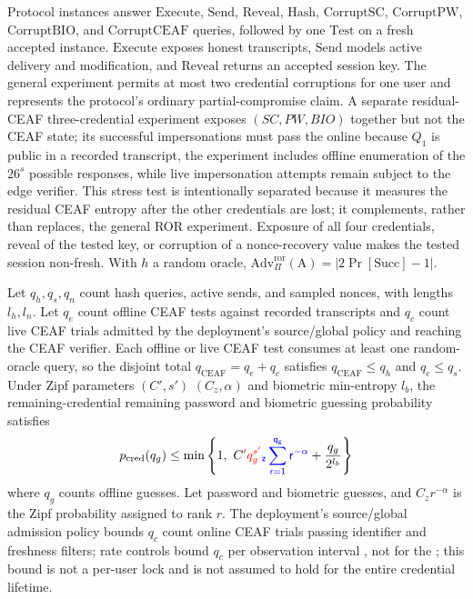 \documentclass[cmc,article,submit,moreauthors,pdftex]{Definitions/tsp}
\renewcommand{\mathsf}[1]{\mathrm{#1}}
\renewcommand{\mathcal}[1]{\mathrm{#1}}
\newcommand{\advA}{\mathcal{A}}
\providecommand{\DIFadd}[1]{{\protect\color{blue} \sf #1}} %
\providecommand{\DIFdel}[1]{{\protect\color{red} \scriptsize #1}} %
\providecommand{\DIFaddbegin}{} %
\providecommand{\DIFaddend}{} %
\providecommand{\DIFdelbegin}{} %
\providecommand{\DIFdelend}{} %
\begin{document}
Protocol instances answer $\mathsf{Execute}$, $\mathsf{Send}$, $\mathsf{Reveal}$, $\mathsf{Hash}$, $\mathsf{CorruptSC}$, $\mathsf{CorruptPW}$, $\mathsf{CorruptBIO}$, and $\mathsf{CorruptCEAF}$ queries, followed by one $\mathsf{Test}$ on a fresh accepted instance. $\mathsf{Execute}$ exposes honest transcripts, $\mathsf{Send}$ models active delivery and modification, and $\mathsf{Reveal}$ returns an accepted session key. The general experiment permits at most two credential corruptions for one user \DIFaddbegin \DIFadd{and represents the protocol's ordinary partial-compromise claim}\DIFaddend . A separate \DIFdelbegin \DIFdel{residual-CEAF }\DIFdelend \DIFaddbegin \DIFadd{three-credential }\DIFaddend experiment exposes $(SC,PW,BIO)$ together but not the CEAF state; \DIFdelbegin \DIFdel{its successful impersonations must pass the online }\DIFdelend \DIFaddbegin \DIFadd{because $Q_1$ is public in a recorded transcript, the experiment includes offline enumeration of the $26^s$ possible responses, while live impersonation attempts remain subject to the }\DIFaddend edge verifier. \DIFaddbegin \DIFadd{This stress test is intentionally separated because it measures the residual CEAF entropy after the other credentials are lost; it complements, rather than replaces, the general ROR experiment. }\DIFaddend Exposure of all four credentials, reveal of the tested key, or corruption of a nonce-recovery value makes the tested session non-fresh. With $h$ a random oracle, $\mathsf{Adv}^{\mathrm{ror}}_\Pi(\advA)=|2\Pr[\mathsf{Succ}]-1|$.

Let $q_h,q_s,q_n$ count hash queries, active sends, and sampled nonces, with lengths $l_h,l_n$. \DIFaddbegin \DIFadd{Let $q_e$ count offline CEAF tests against recorded transcripts and $q_c$ count live CEAF trials admitted by the deployment's source/global policy and reaching the CEAF verifier. Each offline or live CEAF test consumes at least one random-oracle query, so the disjoint total $q_{\mathrm{CEAF}}=q_e+q_c$ satisfies $q_{\mathrm{CEAF}}\le q_h$ and $q_c\le q_s$. }\DIFaddend Under Zipf parameters \DIFdelbegin \DIFdel{$(C',s')$ }\DIFdelend \DIFaddbegin \DIFadd{$(C_z,\alpha)$ }\DIFaddend \cite{wangzipf} and biometric min-entropy $l_b$, the \DIFdelbegin \DIFdel{remaining-credential }\DIFdelend \DIFaddbegin \DIFadd{remaining password and biometric }\DIFaddend guessing probability satisfies
\begin{equation}
p_{\mathrm{cred}}(q_g)\le
 \min\left\{1,\ C\DIFdelbegin \DIFdel{' q_g^{s'}}\DIFdelend \DIFaddbegin \DIFadd{_z\sum_{r=1}^{q_g}r^{-\alpha}}\DIFaddend +\frac{q_g}{2^{l_b}}\right\}
\label{eq:pcred}
\end{equation}
where $q_g$ counts \DIFdelbegin \DIFdel{offline guesses. Let }\DIFdelend \DIFaddbegin \DIFadd{password and biometric guesses, and $C_z r^{-\alpha}$ is the Zipf probability assigned to rank $r$. The deployment's source/global admission policy bounds }\DIFaddend $q_c$ \DIFdelbegin \DIFdel{count online CEAF trials passing identifier and freshness filters; rate controls bound $q_c$ }\DIFdelend per observation interval\DIFdelbegin \DIFdel{, not for the }\DIFdelend \DIFaddbegin \DIFadd{; this bound is not a per-user lock and is not assumed to hold for the entire }\DIFaddend credential lifetime.
\end{document}
